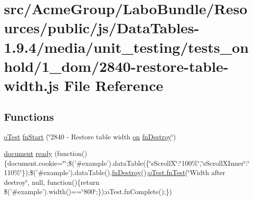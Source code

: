 \hypertarget{2840-restore-table-width_8js}{\section{src/\+Acme\+Group/\+Labo\+Bundle/\+Resources/public/js/\+Data\+Tables-\/1.9.4/media/unit\+\_\+testing/tests\+\_\+onhold/1\+\_\+dom/2840-\/restore-\/table-\/width.js File Reference}
\label{2840-restore-table-width_8js}
}
\subsection*{Functions}
\begin{DoxyCompactItemize}
\item 
\hyperlink{unit__test_8js_a3b2d259e2df3b6860d9047a92d09d0d6}{o\+Test} \hyperlink{2840-restore-table-width_8js_af86e2a8291ecc6cd3d95bb4c43303184}{fn\+Start} (\char`\"{}2840 -\/ Restore table width \hyperlink{fullpage_2plugin_8min_8js_a1cfa98b7fed2aaf9fee3b68dbb7f9497}{on} \hyperlink{api_8methods_8js_ac4eaeaebd8fb562f32bcb4bc6803b55d}{fn\+Destroy}\char`\"{})
\item 
\hyperlink{outside_events_8js_aa14f8e0338cced6720590fd2ea13bd4b}{document} \hyperlink{2840-restore-table-width_8js_a72c76d93e11368ed8c59e0cc5fc7eb34}{ready} (function()\{document.\+cookie=\char`\"{}\char`\"{};\$('\#example').data\+Table(\{\char`\"{}s\+Scroll\+X\char`\"{}\+:\char`\"{}100\%\char`\"{},\char`\"{}s\+Scroll\+X\+Inner\char`\"{}\+:\char`\"{}110\%\char`\"{}\});\$('\#example').data\+Table().\hyperlink{api_8methods_8js_ac4eaeaebd8fb562f32bcb4bc6803b55d}{fn\+Destroy}();\hyperlink{__zero__config__objects__subarrays_8js_a7f100cfe8617a03cd30c47b5e15396a4}{o\+Test.\+fn\+Test}(\char`\"{}Width after destroy\char`\"{}, null, function()\{return \$('\#example').width()==\char`\"{}800\char`\"{};\});o\+Test.\+fn\+Complete();\})
\end{DoxyCompactItemize}


